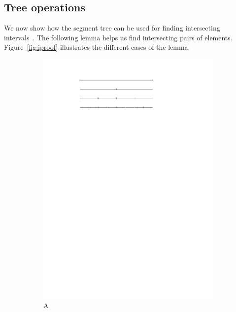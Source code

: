 \documentclass[english,gradu]{tktltiki2018}
\begin{document}
\subsection{Tree operations}\label{sec:treeops}

We now show how the segment tree can be used for finding intersecting intervals~\cite[Chapter 10]{berg2008}.
The following lemma helps us find intersecting pairs of elements.
Figure~\ref{fig:iproof} illustrates the different cases of the lemma.

\begin{figure}\centering
	\begin{subfigure}[t]{0.32\textwidth}\centering
		\includegraphics[width=\textwidth,page=3]{fig/iproof}
		\caption{A}\label{fig:iproof:common}
	\end{subfigure}
	\hfil
	\begin{subfigure}[t]{0.32\textwidth}\centering

\end{subfigure}
\end{figure}
\end{document}
